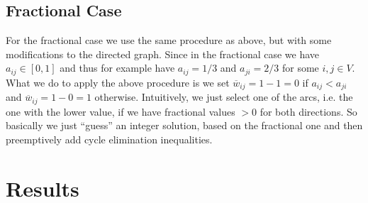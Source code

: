 \documentclass{article}
\begin{document}
\subsection{Fractional Case}

For the fractional case we use the same procedure as above, but with some modifications to the directed graph. Since in the fractional case we have $a_{i j} \in [0, 1]$ and thus for example have $a_{i j} = 1/3$ and $a_{j i} = 2/3$ for some $i,j \in V$. What we do to apply the above procedure is we set $\overline{w}_{i j} = 1 - 1 = 0$ if $a_{i j} < a_{j i}$ and $\overline{w}_{i j} = 1 - 0 = 1$ otherwise. Intuitively, we just select one of the arcs, i.e. the one with the lower value, if we have fractional values $> 0$ for both directions. So basically we just ``guess'' an integer solution, based on the fractional one and then preemptively add cycle elimination inequalities.

\section{Results}
\end{document}

